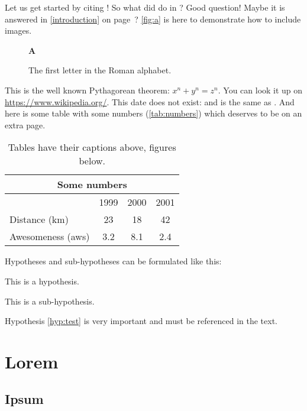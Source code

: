 Let us get started by citing \cite{BeckKKF13}!
So what did \citeauthor{BeckKKF13} do in \citeyear{BeckKKF13}?
Good question!
Maybe it is answered in \cref{introduction} on page~\pageref{introduction}?
\autoref{fig:a} is here to demonstrate how to include images.
\begin{figure}[bt]%
  \begin{center}{\huge\bfseries A}\end{center}
  \caption{The first letter in the Roman alphabet.}\label{fig:a}
\end{figure}
This is the well known Pythagorean theorem: $x^n + y^n = z^n$.
You can look it up on \url{https://www.wikipedia.org/}.
This date does not exist: 
and is the same as .
And here is some table with some numbers (\autoref{tab:numbers})
which deserves to be on an extra page.

\begin{table}[p]%
  \caption{Tables have their captions above, figures below.}
  \begin{center}
    \begin{tabular}{lccc}\toprule
      \multicolumn{4}{c}{Some numbers}       \\\midrule
                        & 1999 & 2000 & 2001 \\\cmidrule(l){2-4}
      Distance (km)     & 23   & 18   & 42   \\
      Awesomeness (aws) & 3.2  & 8.1  & 2.4  \\\bottomrule
    \end{tabular}
  \end{center}\label{tab:numbers}%
\end{table}

Hypotheses and sub-hypotheses can be formulated like this:
\begin{hypothesis}
\label{hyp:test}
This is a hypothesis.
\end{hypothesis}
\begin{shypothesis}
\label{shyp:test}
This is a sub-hypothesis.
\end{shypothesis}
Hypothesis \cref{hyp:test} is very important and must be referenced in the text.

\section{Lorem} \label{sec:lorem}
\lipsum[1-3]

\subsection{Ipsum} \label{ssec:ipsum}
\lipsum[4-7]
